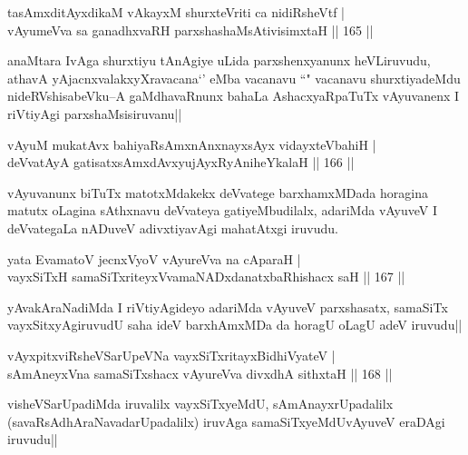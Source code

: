 \begin{shl}
tasAmxditAyxdikaM vAkayxM shurxteVriti ca nidiRsheVtf |\\
vAyumeVva sa ganadhxvaRH parxshashaMsAtivisimxtaH \hfill || 165 ||
\end{shl}

\begin{artha}
anaMtara IvAga shurxtiyu tAnAgiye uLida parxshenxyanunx heVLiruvudu, athavA yAjacnxvalakxyXravacana`\stext' eMba vacanavu ``\stext" vacanavu shurxtiyadeMdu nideRVshisabeVku--A gaMdhavaRnunx bahaLa AshacxyaRpaTuTx vAyuvanenx I riVtiyAgi parxshaMsisiruvanu||
\end{artha}


\begin{shl}
vAyuM mukatAvx bahiyaRsAmxnAnxnayxsAyx vidayxteV\s bahiH |\\
deVvatAyA gatisatxsAmxdAvxyujAyxRyAniheYkalaH \hfill || 166 ||
\end{shl}

\begin{artha}
vAyuvanunx biTuTx matotxMdakekx deVvatege barxhamxMDada horagina matutx oLagina sAthxnavu deVvateya gatiyeMbudilalx, adariMda vAyuveV I deVvategaLa nADuveV adivxtiyavAgi mahatAtxgi iruvudu.
\end{artha}

\begin{shl}
yata EvamatoV jecnxVyoV vAyureVva na cAparaH |\\
vayxSiTxH samaSiTxriteyxVvamaNADxdanatxbaRhishacx saH \hfill || 167 ||
\end{shl}

\begin{artha}
yAvakAraNadiMda I riVtiyAgideyo adariMda vAyuveV parxshasatx, samaSiTx vayxSitxyAgiruvudU saha ideV barxhAmxMDa da horagU oLagU adeV iruvudu||
\end{artha}


\begin{shl}
vAyxpitxviRsheVSarUpeVNa vayxSiTxritayxBidhiVyateV |\\
sAmAneyxVna samaSiTxshacx vAyureVva divxdhA sithxtaH \hfill || 168 ||
\end{shl}

\begin{artha}
visheVSarUpadiMda iruvalilx vayxSiTxyeMdU, sAmAnayxrUpadalilx (savaRsAdhAraNavadarUpadalilx) iruvAga samaSiTxyeMdUvAyuveV eraDAgi iruvudu||
\end{artha}

